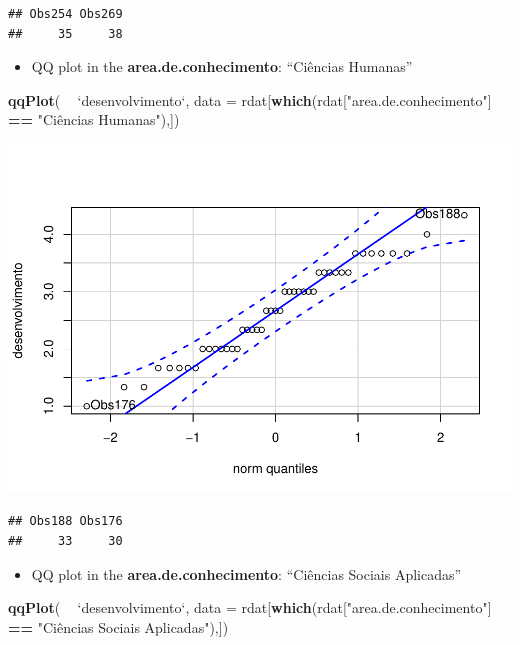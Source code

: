 \documentclass[]{article}
\newenvironment{Shaded}{\begin{snugshade}}{\end{snugshade}}
\newcommand{\DataTypeTok}[1]{\textcolor[rgb]{0.13,0.29,0.53}{#1}}
\newcommand{\KeywordTok}[1]{\textcolor[rgb]{0.13,0.29,0.53}{\textbf{#1}}}
\newcommand{\NormalTok}[1]{#1}
\newcommand{\OperatorTok}[1]{\textcolor[rgb]{0.81,0.36,0.00}{\textbf{#1}}}
\newcommand{\StringTok}[1]{\textcolor[rgb]{0.31,0.60,0.02}{#1}}
\providecommand{\tightlist}{%
  \setlength{\itemsep}{0pt}\setlength{\parskip}{0pt}}
\begin{document}
\begin{verbatim}
## Obs254 Obs269 
##     35     38
\end{verbatim}

\begin{itemize}
\tightlist
\item
  QQ plot in the \textbf{area.de.conhecimento}: ``Ciências Humanas''
\end{itemize}

\begin{Shaded}
\begin{Highlighting}[]
\KeywordTok{qqPlot}\NormalTok{( }\OperatorTok{~}\StringTok{ `}\DataTypeTok{desenvolvimento}\StringTok{`}\NormalTok{, }\DataTypeTok{data =}\NormalTok{ rdat[}\KeywordTok{which}\NormalTok{(rdat[}\StringTok{"area.de.conhecimento"}\NormalTok{] }\OperatorTok{==}\StringTok{ "Ciências Humanas"}\NormalTok{),])}
\end{Highlighting}
\end{Shaded}

\includegraphics{factorialAnova_files/figure-latex/unnamed-chunk-13-1.pdf}

\begin{verbatim}
## Obs188 Obs176 
##     33     30
\end{verbatim}

\begin{itemize}
\tightlist
\item
  QQ plot in the \textbf{area.de.conhecimento}: ``Ciências Sociais
  Aplicadas''
\end{itemize}

\begin{Shaded}
\begin{Highlighting}[]
\KeywordTok{qqPlot}\NormalTok{( }\OperatorTok{~}\StringTok{ `}\DataTypeTok{desenvolvimento}\StringTok{`}\NormalTok{, }\DataTypeTok{data =}\NormalTok{ rdat[}\KeywordTok{which}\NormalTok{(rdat[}\StringTok{"area.de.conhecimento"}\NormalTok{] }\OperatorTok{==}\StringTok{ "Ciências Sociais Aplicadas"}\NormalTok{),])}
\end{Highlighting}
\end{Shaded}
\end{document}
